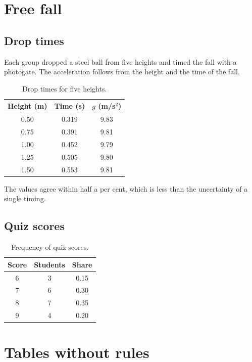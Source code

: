 \documentclass[11pt]{article}
\begin{document}
\tableofcontents

\section{Free fall}
\subsection{Drop times}

Each group dropped a steel ball from five heights and timed the fall with a photogate.
The acceleration follows from the height and the time of the fall.

\begin{table}[h]
\centering
\caption{Drop times for five heights.}
\begin{tabular}{ccc}
\toprule
Height (m) & Time (s) & $g$ (m/s$^2$) \\
\midrule
0.50 & 0.319 & 9.83 \\
0.75 & 0.391 & 9.81 \\
1.00 & 0.452 & 9.79 \\
1.25 & 0.505 & 9.80 \\
1.50 & 0.553 & 9.81 \\
\bottomrule
\end{tabular}
\end{table}

The values agree within half a per cent, which is less than the uncertainty of a
single timing.

\subsection{Quiz scores}

\begin{table}[h]
\centering
\caption{Frequency of quiz scores.}
\begin{tabular}{|c|c|c|}
\hline
Score & Students & Share \\
\hline
6 & 3 & 0.15 \\
\hline
7 & 6 & 0.30 \\
\hline
8 & 7 & 0.35 \\
\hline
9 & 4 & 0.20 \\
\hline
\end{tabular}
\end{table}

\clearpage
\section{Tables without rules}
\end{document}
